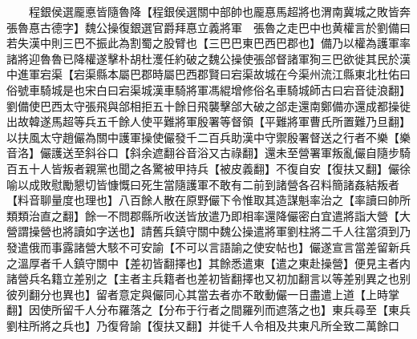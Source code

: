 　　程銀侯選龎悳皆隨魯降【程銀侯選關中部帥也龎惪馬超將也渭南冀城之敗皆奔張魯惪古德字】魏公操復銀選官爵拜惪立義將軍　張魯之走巴中也黄權言於劉備曰若失漢中則三巴不振此為割蜀之股臂也【三巴巴東巴西巴郡也】備乃以權為護軍率諸將迎魯魯已降權遂擊朴胡杜濩任約破之魏公操使張郃督諸軍狥三巴欲徙其民於漢中進軍宕渠【宕渠縣本屬巴郡時屬巴西郡賢曰宕渠故城在今渠州流江縣東北杜佑曰俗號車騎城是也宋白曰宕渠城漢車騎將軍馮緄增修俗名車騎城師古曰宕音徒浪翻】劉備使巴西太守張飛與郃相拒五十餘日飛襲擊郃大破之郃走還南鄭備亦還成都操徙出故韓遂馬超等兵五千餘人使平難將軍殷署等督領【平難將軍曹氏所置難乃旦翻】以扶風太守趙儼為關中護軍操使儼發千二百兵助漢中守禦殷署督送之行者不樂【樂音洛】儼護送至斜谷口【斜余遮翻谷音浴又古祿翻】還未至營署軍叛亂儼自隨步騎百五十人皆叛者親黨也聞之各驚被甲持兵【被皮義翻】不復自安【復扶又翻】儼徐喻以成敗慰勵懇切皆慷慨曰死生當隨護軍不敢有二前到諸營各召料簡諸姦結叛者【料音聊量度也理也】八百餘人散在原野儼下令惟取其造謀魁率治之【率讀曰帥所類類治直之翻】餘一不問郡縣所收送皆放遣乃即相率還降儼密白宜遣將詣大營【大營謂操營也將讀如字送也】請舊兵鎮守關中魏公操遣將軍劉柱將二千人往當須到乃發遣俄而事露諸營大駭不可安諭【不可以言語諭之使安帖也】儼遂宣言當差留新兵之溫厚者千人鎮守關中【差初皆翻擇也】其餘悉遣東【遣之東赴操營】便見主者内諸營兵名籍立差别之【主者主兵籍者也差初皆翻擇也又初加翻言以等差别異之也别彼列翻分也異也】留者意定與儼同心其當去者亦不敢動儼一日盡遣上道【上時掌翻】因使所留千人分布羅落之【分布于行者之間羅列而遮落之也】東兵尋至【東兵劉柱所將之兵也】乃復脅諭【復扶又翻】并徙千人令相及共東凡所全致二萬餘口

